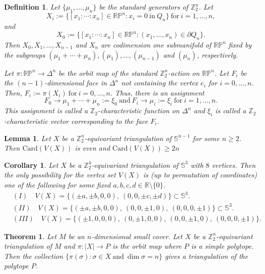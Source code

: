 \documentclass[10pt,a4paper]{amsart}
\newtheorem{defn}{Definition}
\newtheorem{lemma}{Lemma}
\newtheorem{corollary}{Corollary}
\newtheorem{theorem}{Theorem}
\newcommand{\Sp}{\mathbb{S}}
\def \ZZ{{\bb{Z}}}
\def \bb{\mathbb}
\begin{document}
\begin{defn}\label{Charecteristic}
Let $\{\mu_1, \ldots, \mu_n\}$ be the standard generators of $\ZZ_2^n$.
Let $$X_i := \{[x_1: \cdots : x_n] \in \mathbb{RP}^n : x_i=0 ~\mbox{in}~ Q_n\}~ \mbox{for}~ i= 1, \ldots, n,$$
and $$X_0 := \{[x_1 : \cdots : x_n] \in \mathbb{RP}^n : (x_1, \ldots, x_n) \in \partial Q_n\}.$$ 
Then $X_0, X_1, \ldots, X_{n-1}$ and $ X_n$ are codimension one submanifold of $\mathbb{RP}^n$ fixed by the subgroups
$(\mu_1+ \cdots + \mu_n), (\mu_1), \ldots, (\mu_{n-1})$ and $(\mu_n)$, respectively. 

Let $\pi \colon \mathbb{RP}^n \to \Delta^n$ be the orbit map of the standard $\ZZ_2^n$-action on $\mathbb{RP}^n$. 
Let $F_i$ be the $(n-1)$-dimensional face in $\Delta^n$ not containing the vertex $e_i$ for $i=0, \ldots, n$. Then, $F_i := \pi(X_i)~\mbox{for}~ i= 0, \ldots, n$.
Thus, there is an assignment 
$$F_0 \to \mu_1+ \cdots + \mu_n:=\xi_0 ~\mbox{and} ~ F_i \to \mu_i :=\xi_i ~ \mbox{for}~ i =1, \ldots, n.$$
This assignment is called a $\ZZ_2$-{\em characteristic function} on $\Delta^n$ and $\xi_i$
is called a $\ZZ_2$-characteristic vector corresponding to the face $F_i$. 

\end{defn}

\begin{lemma}\label{lem3}
Let $X$ be a $\ZZ^{n}_2$-equivariant triangulation of $\Sp^{n-1}$ for some $n\geq 2$. Then $\mathrm{Card}(V(X))$ is even and $\mathrm{Card}( V(X)) \geq 2n$
\end{lemma}

\begin{corollary}\label{8vertex}
Let $X$ be a $\mathbb{Z}_2^4$-equivariant triangulation of $\mathbb{S}^3$ with $8$ vertices. 
Then the only possibility for the vertex set $V(X)$ is (up to permutation of coordinates) one of the following for some fixed $a,b,c,d \in\mathbb{R}\setminus\{0\}$.
$$
\begin{aligned}
&(I)\quad  V(X) = \{(\pm a,\pm b,0,0),\ (0,0,\pm c,\pm d)\} \subset \mathbb{S}^3.\\
&(II)\quad V(X) = \{(\pm a,\pm b,0,0),\ (0,0,\pm 1,0),\ (0,0,0,\pm 1)\} \subset \mathbb{S}^3.\\
&(III)\quad V(X) = \{(\pm 1,0,0,0),\ (0,\pm 1,0,0),\ (0,0,\pm 1,0),\ (0,0,0,\pm 1)\}.
\end{aligned}
$$
\end{corollary}

\begin{theorem}\label{thm2}
Let $M$ be an $n$-dimensional small cover.
Let $X$ be a $\ZZ_2^n$-equivariant triangulation of $M$ and $\pi \colon |X|\rightarrow P$ is the orbit map where $P$ is a simple polytope. Then the collection
$\{\pi(\sigma) \colon \sigma \in X ~ \mbox{and}~ \dim{\sigma} = n\}$ gives a triangulation of the polytope $P$.
\end{theorem}
\end{document}
